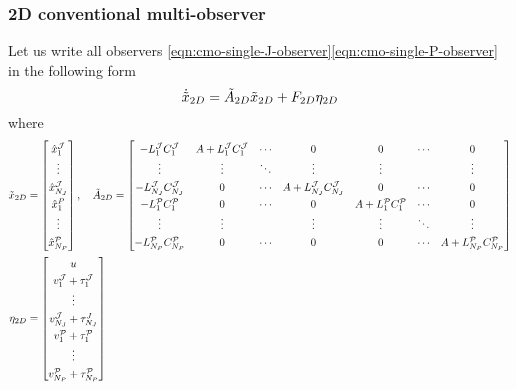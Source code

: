 \subsubsection{2D conventional multi-observer}
Let us write all observers \eqref{eqn:cmo-single-J-observer}\eqref{eqn:cmo-single-P-observer} in the following form
\begin{equation*}
    \dot{\Tilde{x}}_{2D} = \Tilde{A}_{2D}\Tilde{x}_{2D} + F_{2D}\eta_{2D}
\end{equation*}
where
\begin{equation}\label{eqn:2D-CMO}
\renewcommand{\arraystretch}{1.3}
    \begin{split}    
        \Tilde{x}_{2D} &= 
        \begin{bmatrix}
            \hat{x}_1^{\mcJ} \\ \vdots \\ \hat{x}_{N_J}^{\mcJ} \\ \hat{x}_1^{P} \\ \vdots \\ \hat{x}_{N_P}^{\mcP}
        \end{bmatrix}, \quad
        \Tilde{A}_{2D} = 
        \begin{bmatrix}
            -L_1^{\mcJ}C_1^{\mcJ} & A + L_1^{\mcJ}C_1^{\mcJ} & \cdots & 0  & 0 & \cdots & 0 \\
            \vdots & \vdots & \ddots & \vdots & \vdots & & \vdots \\
            -L_{N_J}^{\mcJ}C_{N_J}^{\mcJ} & 0 & \cdots & A + L_{N_J}^{\mcJ}C_{N_J}^{\mcJ} & 0 & \cdots & 0 \\
            -L_{1}^{\mcP}C_{1}^{\mcP} & 0 & \cdots & 0 & A + L_1^{\mcP}C_1^{\mcP} & \cdots & 0 \\
            \vdots & \vdots &  & \vdots & \vdots & \ddots & \vdots \\
            -L_{N_P}^{\mcP}C_{N_P}^{\mcP} & 0 & \cdots & 0 & 0 & \cdots & A + L_{N_P}^{\mcP}C_{N_P}^{\mcP} \\
        \end{bmatrix} \\
        \eta_{2D} &= 
        \begin{bmatrix}
            u \\ v_1^{\mcJ} + \tau_1^{\mcJ} \\ \vdots \\ v_{N_J}^{\mcJ} + \tau_{N_J}^J \\ v_1^{\mcP} + \tau_1^{\mcP} \\ \vdots \\ v_{N_P}^{\mcP} + \tau_{N_P}^{\mcP}\\

\end{bmatrix}
\end{split}
\end{equation}
